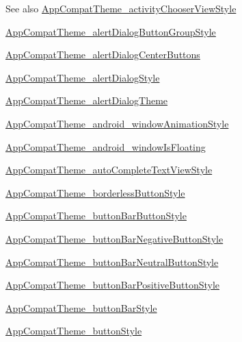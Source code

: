 \begin{DoxySeeAlso}{See also}
\hyperlink{classproject4_1_1xaria_1_1R_1_1styleable_ad55044cb99752002455670fa3f2f4a28}{App\+Compat\+Theme\+\_\+activity\+Chooser\+View\+Style} 

\hyperlink{classproject4_1_1xaria_1_1R_1_1styleable_acb4a414bfb83d9548273fc395f7089bd}{App\+Compat\+Theme\+\_\+alert\+Dialog\+Button\+Group\+Style} 

\hyperlink{classproject4_1_1xaria_1_1R_1_1styleable_a5c8e6a4235c2c98dfbe58c9c3156e38a}{App\+Compat\+Theme\+\_\+alert\+Dialog\+Center\+Buttons} 

\hyperlink{classproject4_1_1xaria_1_1R_1_1styleable_aad7f2a212de4bf58ca6cc476eab41d07}{App\+Compat\+Theme\+\_\+alert\+Dialog\+Style} 

\hyperlink{classproject4_1_1xaria_1_1R_1_1styleable_a5721980038eb99ff7b34164c0824b0f6}{App\+Compat\+Theme\+\_\+alert\+Dialog\+Theme} 

\hyperlink{classproject4_1_1xaria_1_1R_1_1styleable_a9cd010ea2199c7b2d3343acea12f21ce}{App\+Compat\+Theme\+\_\+android\+\_\+window\+Animation\+Style} 

\hyperlink{classproject4_1_1xaria_1_1R_1_1styleable_a82f0023ac5cdc68430cb09e5f9ca2633}{App\+Compat\+Theme\+\_\+android\+\_\+window\+Is\+Floating} 

\hyperlink{classproject4_1_1xaria_1_1R_1_1styleable_a7608aea43314e12bc4f420fc021aac72}{App\+Compat\+Theme\+\_\+auto\+Complete\+Text\+View\+Style} 

\hyperlink{classproject4_1_1xaria_1_1R_1_1styleable_ae837237fac21a2cede4731aba76d2506}{App\+Compat\+Theme\+\_\+borderless\+Button\+Style} 

\hyperlink{classproject4_1_1xaria_1_1R_1_1styleable_ae2759e35f58ee9b12ec64393bc516a42}{App\+Compat\+Theme\+\_\+button\+Bar\+Button\+Style} 

\hyperlink{classproject4_1_1xaria_1_1R_1_1styleable_a88fbb3d960b1618f126b09fb5d07f435}{App\+Compat\+Theme\+\_\+button\+Bar\+Negative\+Button\+Style} 

\hyperlink{classproject4_1_1xaria_1_1R_1_1styleable_ad75543e499457698c2fe0f0bd7349a82}{App\+Compat\+Theme\+\_\+button\+Bar\+Neutral\+Button\+Style} 

\hyperlink{classproject4_1_1xaria_1_1R_1_1styleable_a47fda447e64af3bb3b8673d0c9ad9c53}{App\+Compat\+Theme\+\_\+button\+Bar\+Positive\+Button\+Style} 

\hyperlink{classproject4_1_1xaria_1_1R_1_1styleable_ac078eb7b75a54238baace3e740637b7f}{App\+Compat\+Theme\+\_\+button\+Bar\+Style} 

\hyperlink{classproject4_1_1xaria_1_1R_1_1styleable_a3fab352cdcd70d5bb2081408ab0206af}{App\+Compat\+Theme\+\_\+button\+Style} 


\end{DoxySeeAlso}

